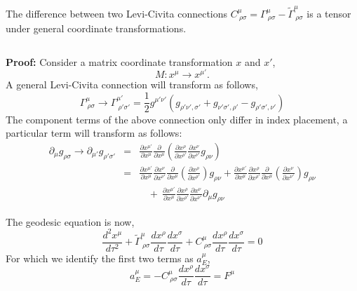 \begin{tcolorbox}
The difference between two Levi-Civita connections $C^{\mu}_{\ \rho \sigma} = \Gamma^{\mu}_{\ \rho \sigma} - \tilde{\Gamma}^{\mu}_{\ \rho \sigma}$ is a tensor under general coordinate transformations. 

$ $

\textbf{Proof:}
Consider a matrix coordinate transformation $x$ and $x'$, $$ M: x^{\mu} \rightarrow x^{\mu'}. $$ A general Levi-Civita connection will transform as follows,
\begin{equation}
    \Gamma^{\mu}_{\ \rho \sigma}\rightarrow \Gamma^{\mu'}_{\ \rho' \sigma'} = \frac{1}{2}g^{\mu'\nu'}\left(g_{\rho'\nu', \sigma'} + g_{\nu'\sigma',\rho'}-g_{\rho'\sigma', \nu'}\right)
\end{equation}
The component terms of the above connection only differ in index placement, a particular term will transform as follows:
\begin{eqnarray*}
    \partial_{\mu}g_{\rho\sigma} \rightarrow  \partial_{\mu'}g_{\rho'\sigma'} &=& \frac{\partial x^{\mu'}}{\partial x^{\mu}}\frac{\partial }{\partial x^{\mu}}\left(\frac{\partial x^{\rho}}{\partial x^{\rho'}}\frac{\partial x^{\nu}}{\partial x^{\nu'}}g_{\rho\nu}\right)\\
    &=& \frac{\partial x^{\mu'}}{\partial x^{\mu}}\frac{\partial x^{\nu}}{\partial x^{\nu'}}\frac{\partial }{\partial x^{\mu}}\left(\frac{\partial x^{\rho}}{\partial x^{\rho'}}\right)g_{\rho\nu} +
    \frac{\partial x^{\mu'}}{\partial x^{\mu}}\frac{\partial x^{\rho}}{\partial x^{\rho'}}\frac{\partial }{\partial x^{\mu}}\left(\frac{\partial x^{\nu}}{\partial x^{\nu'}}\right)g_{\rho\nu}  \\
    & & \ \ \ \ + \  \frac{\partial x^{\mu'}}{\partial x^{\mu}}\frac{\partial x^{\rho}}{\partial x^{\rho'}}\frac{\partial x^{\nu}}{\partial x^{\nu'}}\partial_{\mu}g_{\rho\nu} 
\end{eqnarray*}
\end{tcolorbox}
The geodesic equation is now,
\begin{equation}
    \frac{d^2x^{\mu}}{d\tau^2} + \tilde{\Gamma}^{\mu}_{\ \rho\sigma}\frac{dx^{\rho}}{d\tau}\frac{dx^{\sigma}}{d\tau} + C^{\mu}_{\ \rho\sigma}\frac{dx^{\rho}}{d\tau}\frac{dx^{\sigma}}{d\tau} =0
\end{equation}
For which we identify the first two terms as $a_{E}^{\mu}$,
\begin{equation}
    a_{E}^{\mu} = -C^{\mu}_{\ \rho\sigma}\frac{dx^{\rho}}{d\tau}\frac{dx^{\sigma}}{d\tau} = F^{\mu}
\end{equation}
